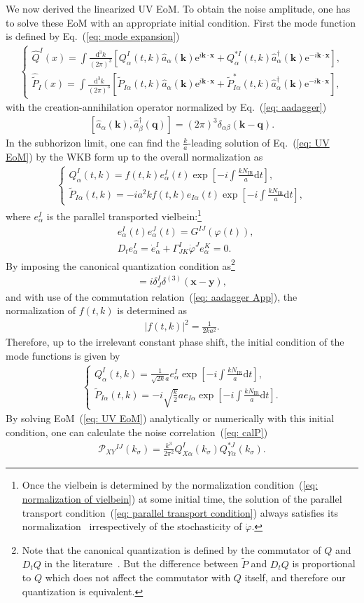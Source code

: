\documentclass[a4paper,11pt]{article}
\newcommand{\dd}{\mathrm{d}}
\newcommand{\ee}{\mathrm{e}}
\newcommand{\IR}{\text{IR}}
\newcommand{\dk}{\frac{\dd^3k}{(2\pi)^3}}
\newcommand{\dps}{\displaystyle}
\newcommand{\kdx}{\mathbf{k}\cdot\mathbf{x}}
\newcommand{\calP}{\mathcal{P}}
\newcommand{\bae}[1]{\begin{align} #1 \end{align}}
\newcommand{\bce}[1]{\begin{cases} #1 \end{cases}}
\begin{document}
We now derived the linearized UV EoM.
To obtain the noise amplitude, one has to solve these EoM with an appropriate initial condition.
First the mode function is defined by Eq.~(\ref{eq: mode expansion})
\bae{
	\bce{
		\dps
		\hat{Q}^I(x)=\int\dk\left[Q^I_\alpha(t,k)\hat{a}_\alpha(\mathbf{k})\ee^{i\kdx}
		+Q^{*I}_\alpha(t,k)\hat{a}^\dagger_\alpha(\mathbf{k})\ee^{-i\kdx}\right], \\[10pt]
		\dps
		\hat{\tilde{P}}_I(x)=\int\dk\left[\tilde{P}_{I\alpha}(t,k)\hat{a}_\alpha(\mathbf{k})\ee^{i\kdx}
		+\tilde{P}^*_{I\alpha}(t,k)\hat{a}^\dagger_\alpha(\mathbf{k})\ee^{-i\kdx}\right],
	}
}
with the creation-annihilation operator normalized by Eq.~(\ref{eq: aadagger})
\bae{\label{eq: aadagger App}
	[\hat{a}_\alpha(\mathbf{k}),\hat{a}^\dagger_\beta(\mathbf{q})]=(2\pi)^3\delta_{\alpha\beta}(\mathbf{k}-\mathbf{q}).
}
In the subhorizon limit, one can find the $\frac{k}{a}$-leading solution of Eq.~(\ref{eq: UV EoM}) by the WKB form up to the overall normalization as
\bae{
	\bce{
		\dps
		Q^I_\alpha(t,k)=f(t,k)e^I_\alpha(t)\exp\left[-i\int\frac{kN_\IR}{a}\dd t\right], \\[10pt]
		\dps
		\tilde{P}_{I\alpha}(t,k)=-ia^2kf(t,k)e_{I\alpha}(t)\exp\left[-i\int\frac{kN_\IR}{a}\dd t\right],
	}
}
where $e^I_\alpha$ is the parallel transported vielbein:\footnote{Once the vielbein is determined by the normalization 
condition~(\ref{eq: normalization of vielbein}) at some initial time, the solution of the parallel transport condition~(\ref{eq: parallel transport condition})
always satisfies its normalization~\cite{Weinberg:2008zzc} irrespectively of the stochasticity of $\dot{\varphi}$.}
\bae{
	&e^I_\alpha(t) e^J_\alpha(t)=G^{IJ}(\varphi(t)), \label{eq: normalization of vielbein} \\
	&D_te^I_\alpha=\dot{e}^I_\alpha+\Gamma^I_{JK}\dot{\varphi}^Je^K_\alpha=0. \label{eq: parallel transport condition}
}
By imposing the canonical quantization condition as\footnote{Note that the canonical quantization is defined by the commutator of $Q$ and $D_tQ$
in the literature~\cite{Dias:2015rca,Ronayne:2017qzn}. But the difference between $\tilde{P}$ and $D_tQ$ is proportional to $Q$
which does not affect the commutator with $Q$ itself, and therefore our quantization is equivalent.}
\bae{
	[\hat{Q}^I(t,\mathbf{x}),\hat{\tilde{P}}_J(t,\mathbf{y})]=i\delta^I_J\delta^{(3)}(\mathbf{x}-\mathbf{y}),
}
and with use of the commutation relation~(\ref{eq: aadagger App}), the normalization of $f(t,k)$ is determined as
\bae{
	|f(t,k)|^2=\frac{1}{2ka^2}.
}
Therefore, up to the irrelevant constant phase shift, the initial condition of the mode functions is given by
\bae{
	\bce{
		\dps
		Q^I_\alpha(t,k)=\frac{1}{\sqrt{2k}a}e^I_\alpha\exp\left[-i\int\frac{kN_\IR}{a}\dd t\right], \\[10pt]
		\dps
		\tilde{P}_{I\alpha}(t,k)=-i\sqrt{\frac{k}{2}}ae_{I\alpha}\exp\left[-i\int\frac{kN_\IR}{a}\dd t\right].
	}
}
By solving EoM~(\ref{eq: UV EoM}) analytically or numerically with this initial condition, one can calculate the noise correlation~(\ref{eq: calP})
\bae{
	\calP_{XY}{}^{IJ}(k_\sigma)=\frac{k^3}{2\pi^2}Q_{X\alpha}^I(k_\sigma)Q_{Y\alpha}^{*J}(k_\sigma).
}
\end{document}
